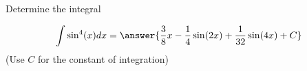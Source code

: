 \documentclass{ximera}
\author{Jason Miller}
\begin{document}
\begin{exercise}
Determine the integral

\[
\int \sin^{4}(x) dx= \answer{     \frac{3}{8}x-\frac{1}{4} \sin(2x) + \frac{1}{32} \sin(4x) +C} 
\]
(Use $C$ for the constant of integration)

\end{exercise}
\end{document}
